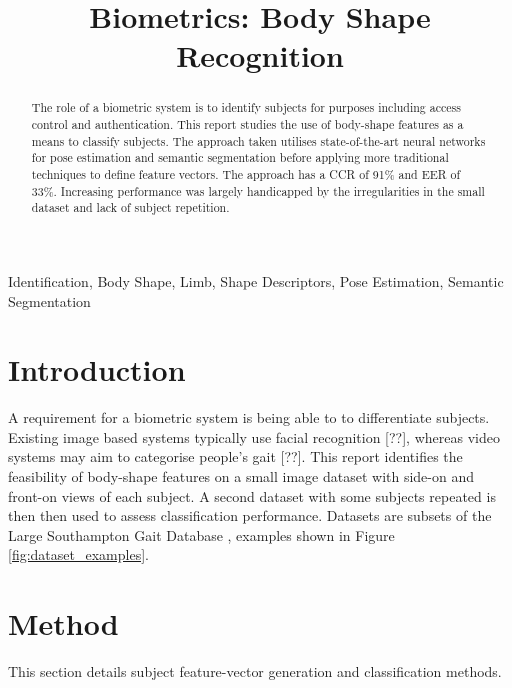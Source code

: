 \documentclass[conference]{IEEEtran} %
\begin{document}
\title{Biometrics: Body Shape Recognition\\
}

\author{
}
\maketitle

\begin{abstract}
  The role of a biometric system is to identify subjects for purposes including access control and authentication. This report studies the use of body-shape features as a means to classify subjects. The approach taken utilises state-of-the-art neural networks for pose estimation and semantic segmentation before applying more traditional techniques to define feature vectors. The approach has a CCR of 91\% and EER of 33\%. Increasing performance was largely handicapped by the irregularities in the small dataset and lack of subject repetition.
\end{abstract}

\begin{IEEEkeywords}
Identification, Body Shape, Limb, Shape Descriptors, Pose Estimation, Semantic Segmentation
\end{IEEEkeywords}

\section{Introduction}
\noindent A requirement for a biometric system is being able to to differentiate subjects. Existing image based systems typically use facial recognition [??], whereas video systems may aim to categorise people's gait [??]. This report identifies the feasibility of body-shape features on a small image dataset with side-on and front-on views of each subject. A second dataset with some subjects repeated is then then used to assess classification performance. Datasets are subsets of the Large Southampton Gait Database \cite{shutler:gait_database}, examples shown in Figure \ref{fig:dataset_examples}.

\section{Method}
\noindent This section details subject feature-vector generation and classification methods.
\end{document}
